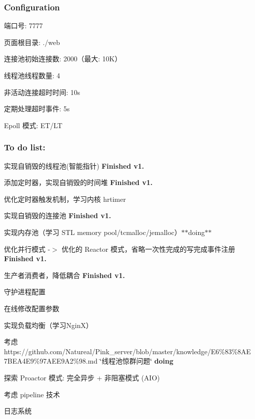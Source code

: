 \subsubsection*{Configuration}


\begin{DoxyItemize}
\item 端口号\+: 7777
\item 页面根目录\+: ./web
\item 连接池初始连接数\+: 2000（最大\+: 10\+K）
\item 线程池线程数量\+: 4
\item 非活动连接超时时间\+: 10s
\item 定期处理超时事件\+: 5s
\item Epoll 模式\+: E\+T/\+LT 


\end{DoxyItemize}

\subsubsection*{To do list\+:}


\begin{DoxyEnumerate}
\item 实现自销毁的线程池(智能指针) {\bfseries Finished v1.}
\item 添加定时器，实现自销毁的时间堆 {\bfseries Finished v1.}
\item 优化定时器触发机制，学习内核 hrtimer
\item 实现自销毁的连接池 {\bfseries Finished v1.}
\item 实现内存池（学习 S\+TL memory pool/tcmalloc/jemalloc）$\ast$$\ast$doing$\ast$$\ast$
\item 优化并行模式 -\/$>$ 优化的 Reactor 模式，省略一次性完成的写完成事件注册 {\bfseries Finished v1.}
\item 生产者消费者，降低耦合 {\bfseries Finished v1.}
\item 守护进程配置
\item 在线修改配置参数
\item 实现负载均衡（学习\+Ngin\+X）
\item 考虑https\+://github.com/\+Natureal/\+Pink\+\_\+server/blob/master/knowledge/E6\%83\%8AE7BEA4E9\%97AEE9A2\%98.\+md \char`\"{}线程池惊群问题\char`\"{} {\bfseries doing}
\item 探索 Proactor 模式\+: 完全异步 + 非阻塞模式 (A\+IO)
\item 考虑 pipeline 技术
\item 日志系统 
\end{DoxyEnumerate}